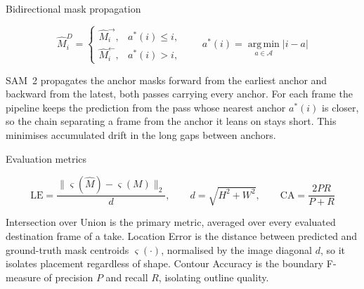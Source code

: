 \documentclass[professionalfonts,aspectratio=169]{beamer}
\begin{document}
\begin{frame}[t]
\begin{center}
{\large Bidirectional mask propagation}
\end{center}
\vfill
\begin{center}
\[
  \hat{M}^D_i =
  \begin{cases}
    \hat{M}^{\rightarrow}_i, & a^\ast(i) \leq i,\\[3pt]
    \hat{M}^{\leftarrow}_i, & a^\ast(i) > i,
  \end{cases}
  \qquad
  a^\ast(i) = \operatorname*{arg\,min}_{a \in \mathcal{A}} \lvert i - a \rvert
\]
\end{center}
\vspace{0.4em}
\begin{center}
\begin{minipage}{0.88\textwidth}
\small
SAM~2 propagates the anchor masks forward from the earliest anchor and backward from the latest, both passes carrying every anchor. For each frame the pipeline keeps the prediction from the pass whose nearest anchor $a^\ast(i)$ is closer, so the chain separating a frame from the anchor it leans on stays short. This minimises accumulated drift in the long gaps between anchors.
\end{minipage}
\end{center}
\vfill
\end{frame}


\begin{frame}[t]
\begin{center}
{\large Evaluation metrics}
\end{center}
\vfill
\begin{center}
\[
  \text{LE} = \frac{\lVert \varsigma(\hat{M}) - \varsigma(M) \rVert_2}{d},
  \qquad d = \sqrt{H^2 + W^2},
  \qquad
  \text{CA} = \frac{2 P R}{P + R}
\]
\end{center}
\vspace{0.4em}
\begin{center}
\begin{minipage}{0.88\textwidth}
\small
Intersection over Union is the primary metric, averaged over every evaluated destination frame of a take. Location Error is the distance between predicted and ground-truth mask centroids $\varsigma(\cdot)$, normalised by the image diagonal $d$, so it isolates placement regardless of shape. Contour Accuracy is the boundary F-measure of precision $P$ and recall $R$, isolating outline quality.
\end{minipage}
\end{center}
\vfill
\end{frame}
\end{document}
